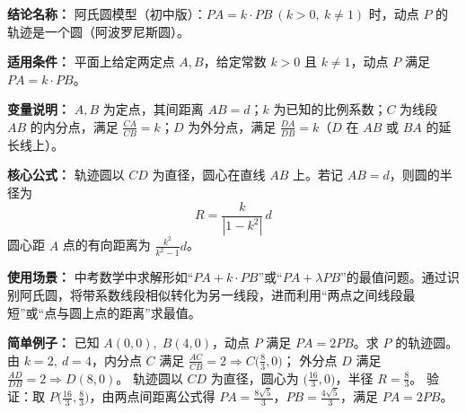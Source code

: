 \textbf{结论名称：} 阿氏圆模型（初中版）：\(PA = k \cdot PB\ (k>0,\ k \neq 1)\) 时，动点 \(P\) 的轨迹是一个圆（阿波罗尼斯圆）。

\textbf{适用条件：} 平面上给定两定点 \(A,B\)，给定常数 \(k>0\) 且 \(k \neq 1\)，动点 \(P\) 满足 \(PA = k \cdot PB\)。

\textbf{变量说明：} \(A,B\) 为定点，其间距离 \(AB = d\)；\(k\) 为已知的比例系数；\(C\) 为线段 \(AB\) 的内分点，满足 \(\frac{CA}{CB}=k\)；\(D\) 为外分点，满足 \(\frac{DA}{DB}=k\)（\(D\) 在 \(AB\) 或 \(BA\) 的延长线上）。

\textbf{核心公式：} 轨迹圆以 \(CD\) 为直径，圆心在直线 \(AB\) 上。若记 \(AB = d\)，则圆的半径为
\[
\boxed{R = \frac{k}{|1-k^{2}|}\,d}
\]
圆心距 \(A\) 点的有向距离为 \(\displaystyle \frac{k^{2}}{k^{2}-1}d\)。

\textbf{使用场景：} 中考数学中求解形如“\(PA + k \cdot PB\)”或“\(PA + \lambda PB\)”的最值问题。通过识别阿氏圆，将带系数线段相似转化为另一线段，进而利用“两点之间线段最短”或“点与圆上点的距离”求最值。

\textbf{简单例子：} 已知 \(A(0,0),\; B(4,0)\)，动点 \(P\) 满足 \(PA = 2PB\)。求 \(P\) 的轨迹圆。
由 \(k=2,\ d=4\)，内分点 \(C\) 满足 \(\frac{AC}{CB}=2 \Rightarrow C\bigl(\frac{8}{3},0\bigr)\)；
外分点 \(D\) 满足 \(\frac{AD}{DB}=2 \Rightarrow D(8,0)\)。
轨迹圆以 \(CD\) 为直径，圆心为 \(\bigl(\frac{16}{3},0\bigr)\)，半径 \(R = \frac{8}{3}\)。
验证：取 \(P\bigl(\frac{16}{3},\frac{8}{3}\bigr)\)，由两点间距离公式得 \(PA = \frac{8\sqrt{5}}{3}\)，\(PB = \frac{4\sqrt{5}}{3}\)，满足 \(PA = 2PB\)。